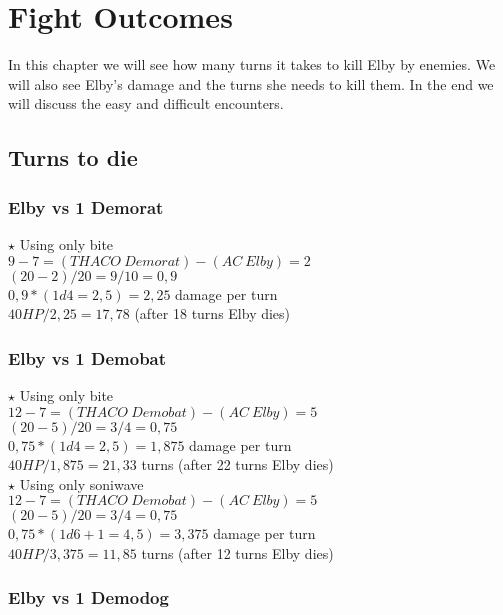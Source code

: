 \section{Fight Outcomes}
In this chapter we will see how many turns it takes to kill Elby by enemies. We will also see Elby's damage and the turns she needs to kill them. In the end we will discuss the easy and difficult encounters.

\subsection{Turns to die}

\subsubsection*{Elby vs 1 Demorat}

$\star$ Using only bite\\
$9-7 = (THACO\:Demorat) - (AC\:Elby) = 2$\\
$(20-2)/20 =9/10 = 0,9$\\
$0,9 * (1d4 = 2,5) = 2,25$ damage per turn\\
$40 HP/ 2,25 = 17,78$ (after 18 turns Elby dies)\\

\subsubsection*{Elby vs 1 Demobat}

$\star$ Using only bite\\
$12-7 = (THACO\:Demobat) - (AC\:Elby) = 5$\\
$(20-5)/20 = 3/4 = 0,75$\\
$0,75 * (1d4 = 2,5) = 1,875$ damage per turn\\
$40 HP/ 1,875 = 21,33$ turns (after 22 turns Elby dies)\\
\newline
$\star$ Using only soniwave\\
$12-7 = (THACO\:Demobat) - (AC\:Elby) = 5$\\
$(20-5)/20 = 3/4 = 0,75$\\
$0,75 * (1d6+1 = 4,5) = 3,375$ damage per turn\\
$40 HP/ 3,375 = 11,85$ turns (after 12 turns Elby dies)\\

\subsubsection*{Elby vs 1 Demodog}

